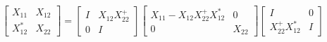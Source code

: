 $$
\left[\begin{array}{ll}
X_{11} & X_{12} \\
X_{12}^{*} & X_{22}
\end{array}\right]=\left[\begin{array}{cc}
I & X_{12} X_{22}^{+} \\
0 & I
\end{array}\right]\left[\begin{array}{cc}
X_{11}-X_{12} X_{22}^{+} X_{12}^{*} & 0 \\
0 & X_{22}
\end{array}\right]\left[\begin{array}{cc}
I & 0 \\
X_{22}^{+} X_{12}^{*} & I
\end{array}\right]
$$